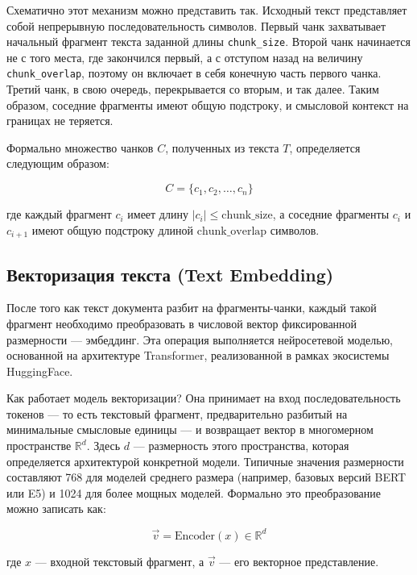 Схематично этот механизм можно представить так. Исходный текст представляет собой непрерывную последовательность символов. Первый чанк захватывает начальный фрагмент текста заданной длины \texttt{chunk\_size}. Второй чанк начинается не с того места, где закончился первый, а с отступом назад на величину \texttt{chunk\_overlap}, поэтому он включает в себя конечную часть первого чанка. Третий чанк, в свою очередь, перекрывается со вторым, и так далее. Таким образом, соседние фрагменты имеют общую подстроку, и смысловой контекст на границах не теряется.

Формально множество чанков $C$, полученных из текста $T$, определяется следующим образом:

\begin{equation}
C = \{c_1, c_2, \ldots, c_n\}
\end{equation}

где каждый фрагмент $c_i$ имеет длину $|c_i| \leq \text{chunk\_size}$, а соседние фрагменты $c_i$ и $c_{i+1}$ имеют общую подстроку длиной $\text{chunk\_overlap}$ символов.

\subsection{Векторизация текста (Text Embedding)}

После того как текст документа разбит на фрагменты-чанки, каждый такой фрагмент необходимо преобразовать в числовой вектор фиксированной размерности — эмбеддинг. Эта операция выполняется нейросетевой моделью, основанной на архитектуре Transformer, реализованной в рамках экосистемы HuggingFace.

Как работает модель векторизации? Она принимает на вход последовательность токенов — то есть текстовый фрагмент, предварительно разбитый на минимальные смысловые единицы — и возвращает вектор в многомерном пространстве $\mathbb{R}^d$. Здесь $d$ — размерность этого пространства, которая определяется архитектурой конкретной модели. Типичные значения размерности составляют 768 для моделей среднего размера (например, базовых версий BERT или E5) и 1024 для более мощных моделей. Формально это преобразование можно записать как:

\begin{equation}
\vec{v} = \text{Encoder}(x) \in \mathbb{R}^d
\end{equation}

где $x$ — входной текстовый фрагмент, а $\vec{v}$ — его векторное представление.

